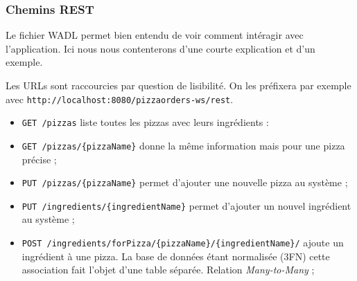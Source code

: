 \subsubsection{Chemins REST}

Le fichier WADL permet bien entendu de voir comment intéragir avec l'application.
Ici nous nous contenterons d'une courte explication et d'un exemple.

Les URLs sont raccourcies par question de lisibilité. 
On les préfixera par exemple avec \verb|http://localhost:8080/pizzaorders-ws/rest|.

\begin{itemize}
    \item \verb|GET /pizzas| liste toutes les pizzas avec leurs ingrédients :
\begin{jsoncode}
\end{jsoncode}

    \item \verb|GET /pizzas/{pizzaName}| donne la même information mais pour une pizza précise ;

    \item \verb|PUT /pizzas/{pizzaName}| permet d'ajouter une nouvelle pizza au système ;

    \item \verb|PUT /ingredients/{ingredientName}| permet d'ajouter un nouvel ingrédient au système ;

    \item \verb|POST /ingredients/forPizza/{pizzaName}/{ingredientName}/| ajoute un ingrédient
           à une pizza. La base de données étant normalisée (3FN) cette association fait l'objet
           d'une table séparée. Relation \emph{Many-to-Many} ;


\end{itemize}
